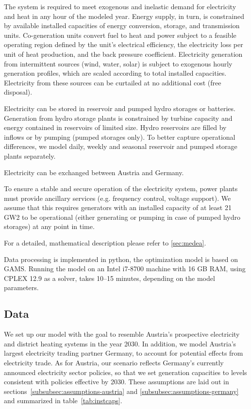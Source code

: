 \documentclass[final, 3p, times]{elsarticle} %
\begin{document}
    The system is required to meet exogenous and inelastic demand for electricity and heat in any hour of the modeled
    year.
    Energy supply, in turn, is constrained by available installed capacities of energy conversion, storage, and
    transmission units.
    Co-generation units convert fuel to heat and power subject to a feasible operating region defined by the unit's
    electrical efficiency, the electricity loss per unit of heat production, and the back pressure coefficient.
    Electricity generation from intermittent sources (wind, water, solar) is subject to exogenous hourly generation
    profiles, which are scaled according to total installed capacities.
    Electricity from these sources can be curtailed at no additional cost (free disposal).

    Electricity can be stored in reservoir and pumped hydro storages or batteries.
    Generation from hydro storage plants is constrained by turbine capacity and energy contained in reservoirs of
    limited size.
    Hydro reservoirs are filled by inflows or by pumping (pumped storages only).
    To better capture operational differences, we model daily, weekly and seasonal reservoir and pumped storage plants
    separately.

    Electricity can be exchanged between Austria and Germany.

    To ensure a stable and secure operation of the electricity system, power plants must provide ancillary services
    (e.g. frequency control, voltage support).
    We assume that this requires generators with an installed capacity of at least 21 GW2 to be operational (either
    generating or pumping in case of pumped hydro storages) at any point in time.

    For a detailed, mathematical description please refer to \ref{sec:medea}.

    Data processing is implemented in python, the optimization model is based on GAMS. Running the model on an Intel
    i7-8700 machine with 16 GB RAM, using CPLEX 12.9 as a solver, takes 10--15 minutes, depending on the model
    parameters.


    \subsection{Data}\label{subsec:data}
    We set up our model with the goal to resemble Austria's prospective electricity and district heating systems in the
    year 2030.
    In addition, we model Austria's largest electricity trading partner Germany, to account for potential effects from
    electricity trade.
    As for Austria, our scenario reflects Germany's currently announced electricity sector policies, so that we set
    generation capacities to levels consistent with policies effective by 2030.
    These assumptions are laid out in sections~\ref{subsubsec:assumptions-austria} and \ref{subsubsec:assumptions-germany}
    and summarized in table~\ref{tab:instcaps}.
\end{document}
